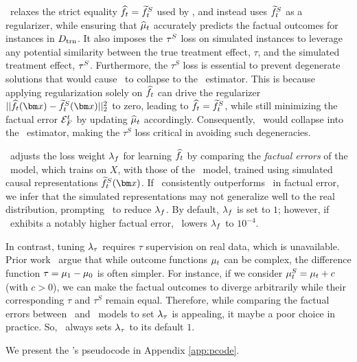 \our\ relaxes the strict equality $\widehat{f}_t = \widetilde{f}^S_t$ used by \muonly, and instead uses $\widetilde{f}^S_t$ as a regularizer, while ensuring that $\widehat{\mu}_t$ accurately predicts the factual outcomes for instances in $D_{\text{trn}}$. It also imposes the $\tau^S$ loss on simulated instances to leverage any potential similarity between the true treatment effect, $\tau$, and the simulated treatment effect, $\tau^S$. Furthermore, the $\tau^S$ loss is essential to prevent degenerate solutions that would cause \our\ to collapse to the \muonly\ estimator. 
This is because applying regularization solely on $\widehat{f}_t$ can drive the regularizer $||\RInvhat_t(\xb) - \SInvTilde_t(\xb)||_2^2$ to zero, leading to $\widehat{f}_t = \widetilde{f}^S_t$, while still minimizing the factual error $\mathcal{E}_F^t$ by updating $\widehat{\mu}_t$ accordingly. Consequently, \our\ would collapse into the \muonly\ estimator, making the $\tau^S$ loss critical in avoiding such degeneracies.


 \our\ adjusts the loss weight $\lambda_{f}$ for learning $\widehat{f}_t$ by comparing the \textit{factual errors} of the \realonly\ model, which trains on $X$, with those of the \muonly\ model, trained using simulated causal representations $\SInvCont_t(\xb)$. If \realonly\ consistently outperforms \muonly\ in factual error, we infer that the simulated representations may not generalize well to the real distribution, prompting \our\ to reduce $\lambda_{f}$. By default, $\lambda_{f}$ is set to $1$; however, if \muonly\ exhibits a notably higher factual error, \our\ lowers $\lambda_{f}$ to $10^{-4}$.


In contrast, tuning $\lambda_{\tau}$ requires $\tau$ supervision on real data, which is unavailable. Prior work~\citep{inducbias, pairnet, xlearner} argue that while outcome functions $\mu_t$ can be complex, the difference function $\tau = \mu_1 - \mu_0$ is often simpler. For instance, if we consider $\mu^S_t = \mu_t + c$ (with $c > 0$), we can make the factual outcomes to diverge arbitrarily while their corresponding $\tau$ and $\tau^S$ remain equal. Therefore, while comparing the factual errors between \simonly\ and \realonly\ models to set $\lambda_{\tau}$ is appealing, it maybe a poor choice in practice. So, \our\ always sets $\lambda_{\tau}$ to its default $1$.


We present the \our's pseudocode in Appendix \ref{app:pcode}.
